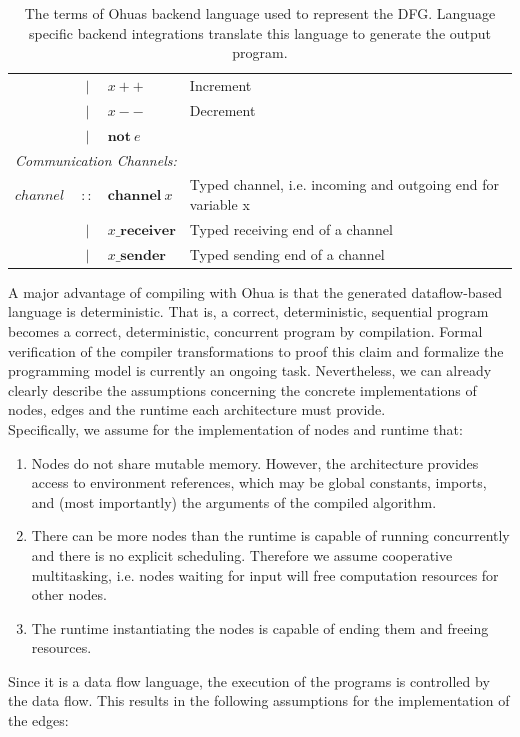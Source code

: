 \begin{table}[ht]
{\begin{tabular}{l c l l}
        & $|$ & $ x++$ & Increment \\
        & $|$ & $ x--$ & Decrement \\
        & $|$ & $ \textbf{not}\ e$ & \\
        \multicolumn{4}{l}{\emph{Communication Channels:}}\\
        $channel\ $& $::$ &$\textbf{channel}\ x$& Typed channel, i.e. incoming and outgoing end for variable x\\
        & $|$ &$x\textbf{\_receiver}$& Typed receiving end of a  channel  \\
        & $|$ &$x\textbf{\_sender}$ &Typed sending end of a channel  \\
    \end{tabular}%
    }
    \caption{The terms of Ohuas backend language used to represent the DFG. Language specific backend integrations translate this language to generate the output program.}
    \label{tab:DFGdef}
\end{table}

A major advantage of compiling with Ohua is that the generated dataflow-based language is deterministic. That is, a correct, deterministic, sequential program becomes a correct, deterministic, concurrent program by compilation. Formal verification of the compiler transformations to proof this claim and formalize the programming model is currently an ongoing task. Nevertheless, we can already clearly describe the assumptions concerning the concrete implementations of nodes, edges and the runtime each architecture must provide.\\

Specifically, we assume for the implementation of nodes and runtime that:
\begin{enumerate}
    \item Nodes do not share mutable memory. However, the architecture provides access to environment references, which may be global constants, imports, and (most importantly) the arguments of the compiled algorithm.
    \item There can be more nodes than the runtime is capable of running concurrently and there is no explicit scheduling. Therefore we assume cooperative multitasking, i.e. nodes waiting for input will free computation resources for other nodes.
    \item The runtime instantiating the nodes is capable of ending them and freeing resources.
\end{enumerate}

Since it is a data flow language, the execution of the programs is controlled by the data flow. This results in the following assumptions for the implementation of the edges: 

